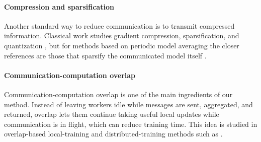 \documentclass{article}
\theoremstyle{plain}
\theoremstyle{definition}
\begin{document}
\paragraph{Compression and sparsification}
Another standard way to reduce communication is to transmit compressed information.
Classical work studies gradient compression, sparsification, and quantization \citep{alistarh2017qsgd, wangni2018gradient, lin2020deepgradientcompression, beznosikov2023biased}, but for methods based on periodic model averaging the closer references are those that sparsify the communicated model itself \citep{beton2025sparta, filippova2025partial, douillard2025streaming, condat2025locodl, condat2026bicolor}.

\paragraph{Communication-computation overlap}
Communication-computation overlap is one of the main ingredients of our method.
Instead of leaving workers idle while messages are sent, aggregated, and returned, overlap lets them continue taking useful local updates while communication is in flight, which can reduce training time.
This idea is studied in overlap-based local-training and distributed-training methods such as \citep{wang2020overlaplocalsgd, sun2024co2, kale2025eager, douillard2025streaming}.
\end{document}
